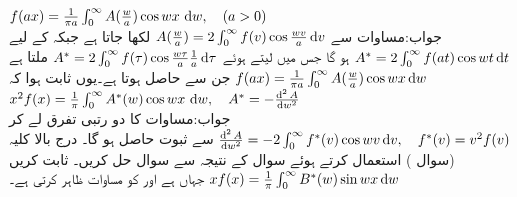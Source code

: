 \quad
$f(ax)=\tfrac{1}{\pi a}\int_0^{\infty} A(\tfrac{w}{a})\cos wx\,\dif w,\quad (a>0)$\\
جواب:\quad مساوات  سے 
$A(\tfrac{w}{a})=2\int_0^{\infty}f(v)\cos \tfrac{wv}{a}\dif v$
 لکھا جاتا ہے جبکہ  کے لیے 
$A^*=2\int_0^{\infty}f(at)\cos wt\dif t$
ہو گا جس میں  لیتے ہوئے 
$A^*=2\int_0^{\infty} f(\tau)\cos \tfrac{w\tau}{a}\tfrac{1}{a}\dif \tau$
ملتا ہے جن سے  حاصل ہوتا ہے۔یوں ثابت ہوا کہ
$f(ax)=\tfrac{1}{\pi a}\int_0^{\infty} A(\tfrac{w}{a})\cos wx\dif w$
\quad
$x^2f(x)=\tfrac{1}{\pi}\int_0^{\infty} A^*(w)\cos wx\,\dif w,\quad A^*=-\tfrac{\dif ^{\,2} A}{\dif w^2}$\\
جواب:\quad مساوات  کا دو رتبی تفرق لے کر
$\tfrac{\dif^{\,2}A}{\dif w^2}=-2\int_0^{\infty} f^*(v)\cos wv\dif v, \quad f^*(v)=v^2f(v)$
سے ثبوت حاصل ہو گا۔
\quad درج بالا کلیہ (سوال ) استعمال کرتے ہوئے سوال  کے نتیجہ سے سوال  حل کریں۔ 
\quad ثابت کریں
$xf(x)=\tfrac{1}{\pi}\int_0^{\infty}B^*(w)\sin wx\dif w$
جہاں  ہے اور  کو مساوات  ظاہر کرتی ہے۔ 

